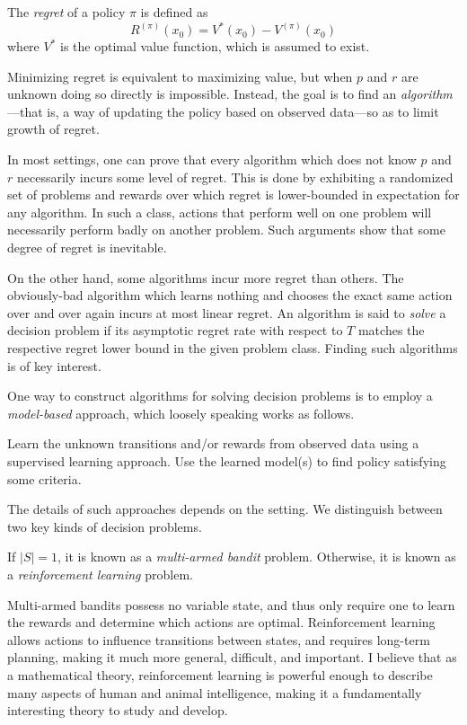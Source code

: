 \documentclass[11pt]{book}
\begin{document}
\begin{definition}[Regret]
The \emph{regret} of a policy $\pi$ is defined as 
\[
R^{(\pi)}(x_0) = V^*(x_0) - V^{(\pi)}(x_0)
\]
where $V^*$ is the optimal value function, which is assumed to exist.
\end{definition}

Minimizing regret is equivalent to maximizing value, but when $p$ and $r$ are unknown doing so directly is impossible.
Instead, the goal is to find an \emph{algorithm}---that is, a way of updating the policy based on observed data---so as to limit growth of regret.

In most settings, one can prove that every algorithm which does not know $p$ and $r$ necessarily incurs some level of regret.
This is done by exhibiting a randomized set of problems and rewards over which regret is lower-bounded in expectation for any algorithm.
In such a class, actions that perform well on one problem will necessarily perform badly on another problem.
Such arguments show that some degree of regret is inevitable.

On the other hand, some algorithms incur more regret than others.
The obviously-bad algorithm which learns nothing and chooses the exact same action over and over again incurs at most linear regret.
An algorithm is said to \emph{solve} a decision problem if its asymptotic regret rate with respect to $T$ matches the respective regret lower bound in the given problem class.
Finding such algorithms is of key interest.

One way to construct algorithms for solving decision problems is to employ a \emph{model-based} approach, which loosely speaking works as follows.

\1 Learn the unknown transitions and/or rewards from observed data using a supervised learning approach.
\2 Use the learned model(s) to find policy satisfying some criteria.
\0 

The details of such approaches depends on the setting.
We distinguish between two key kinds of decision problems.

\1 If $|S| = 1$, it is known as a \emph{multi-armed bandit} problem.
\2 Otherwise, it is known as a \emph{reinforcement learning} problem.
\0 

Multi-armed bandits possess no variable state, and thus only require one to learn the rewards and determine which actions are optimal.
Reinforcement learning allows actions to influence transitions between states, and requires long-term planning, making it much more general, difficult, and important.
I believe that as a mathematical theory, reinforcement learning is powerful enough to describe many aspects of human and animal intelligence, making it a fundamentally interesting theory to study and develop.
\end{document}
